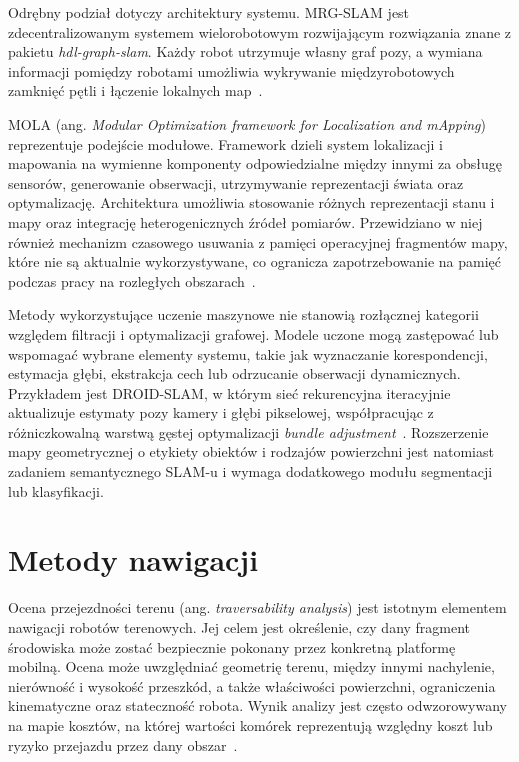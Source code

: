 \documentclass[a4paper,twoside,12pt]{book}
\begin{document}
Odrębny podział dotyczy architektury systemu. MRG-SLAM jest zdecentralizowanym systemem wielorobotowym rozwijającym rozwiązania znane z pakietu \textit{hdl-graph-slam}. Każdy robot utrzymuje własny graf pozy, a wymiana informacji pomiędzy robotami umożliwia wykrywanie międzyrobotowych zamknięć pętli i łączenie lokalnych map~\cite{Serov2024ICARA}.

MOLA (ang. \textit{Modular Optimization framework for Localization and mApping}) reprezentuje podejście modułowe. Framework dzieli system lokalizacji i mapowania na wymienne komponenty odpowiedzialne między innymi za obsługę sensorów, generowanie obserwacji, utrzymywanie reprezentacji świata oraz optymalizację. Architektura umożliwia stosowanie różnych reprezentacji stanu i mapy oraz integrację heterogenicznych źródeł pomiarów. Przewidziano w niej również mechanizm czasowego usuwania z pamięci operacyjnej fragmentów mapy, które nie są aktualnie wykorzystywane, co ogranicza zapotrzebowanie na pamięć podczas pracy na rozległych obszarach~\cite{Blanco_Claraco_RSS_19,blanco2025mola_lo}.

Metody wykorzystujące uczenie maszynowe nie stanowią rozłącznej kategorii względem filtracji i optymalizacji grafowej. Modele uczone mogą zastępować lub wspomagać wybrane elementy systemu, takie jak wyznaczanie korespondencji, estymacja głębi, ekstrakcja cech lub odrzucanie obserwacji dynamicznych. Przykładem jest DROID-SLAM, w którym sieć rekurencyjna iteracyjnie aktualizuje estymaty pozy kamery i głębi pikselowej, współpracując z różniczkowalną warstwą gęstej optymalizacji \textit{bundle adjustment}~\cite{teed2021droid}. Rozszerzenie mapy geometrycznej o etykiety obiektów i rodzajów powierzchni jest natomiast zadaniem semantycznego SLAM-u i wymaga dodatkowego modułu segmentacji lub klasyfikacji.


\section{Metody nawigacji}

Ocena przejezdności terenu (ang. \textit{traversability analysis}) jest istotnym elementem nawigacji robotów terenowych. Jej celem jest określenie, czy dany fragment środowiska może zostać bezpiecznie pokonany przez konkretną platformę mobilną. Ocena może uwzględniać geometrię terenu, między innymi nachylenie, nierówność i wysokość przeszkód, a także właściwości powierzchni, ograniczenia kinematyczne oraz stateczność robota. Wynik analizy jest często odwzorowywany na mapie kosztów, na której wartości komórek reprezentują względny koszt lub ryzyko przejazdu przez dany obszar~\cite{drones8090419}.
\end{document}
